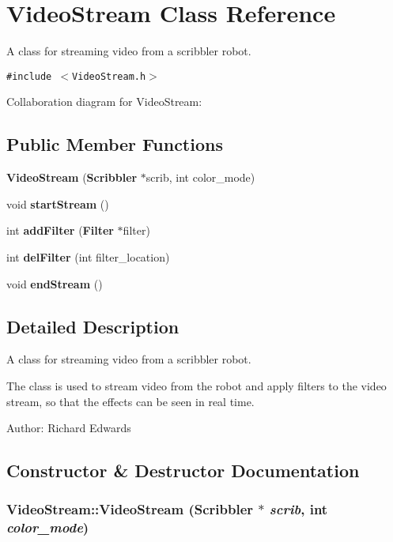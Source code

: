 \section{VideoStream Class Reference}
\label{classVideoStream}
A class for streaming video from a scribbler robot.  


{\tt \#include $<$VideoStream.h$>$}

Collaboration diagram for VideoStream:\subsection*{Public Member Functions}
\begin{CompactItemize}
\item 
{\bf VideoStream} ({\bf Scribbler} $\ast$scrib, int color\_\-mode)
\item 
void {\bf startStream} ()
\item 
int {\bf addFilter} ({\bf Filter} $\ast$filter)
\item 
int {\bf delFilter} (int filter\_\-location)
\item 
void {\bf endStream} ()
\end{CompactItemize}


\subsection{Detailed Description}
A class for streaming video from a scribbler robot. 

The class is used to stream video from the robot and apply filters to the video stream, so that the effects can be seen in real time.

\begin{Desc}
\item[Author:]Richard Edwards \end{Desc}


\subsection{Constructor \& Destructor Documentation}
\subsubsection{\setlength{\rightskip}{0pt plus 5cm}VideoStream::VideoStream ({\bf Scribbler} $\ast$ {\em scrib}, \/  int {\em color\_\-mode})}\label{classVideoStream_27a9bbff3a8f5b1c0a46bb6de342f163}


